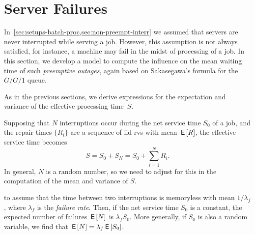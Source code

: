 

\section{Server Failures}
\label{sec:preempt-interr-serv}

In~\cref{sec:setups-batch-proc,sec:non-preempt-interr} we assumed that servers are never interrupted while serving a job.
However, this assumption is not always satisfied, for instance, a machine may fail in the midst of processing of a job.
In this section, we develop a model
to compute the influence on the mean waiting time of such \emph{preemptive outages}, again based on Sakasegawa's formula for the $G/G/1$ queue.



As in the previous sections, we derive expressions for the expectation and variance of the effective processing time~$S$.

Supposing that $N$ interruptions occur during the net service time $S_0$ of a job, and the repair times $\{R_i\}$ are a sequence of iid rvs with mean $\,\mathsf{E}\left[R\right]$, the effective service time becomes
\begin{equation}\label{eq:f1}
  S= S_0 + S_N = S_0 + \sum_{i=1}^N R_i.
\end{equation}
In general,  $N$ is a random number, so we need to adjust for this in the computation of the mean and variance of $S$.


 to assume that the time between two interruptions is memoryless with mean $1/\lambda_f$, where $\lambda_f$ is the \emph{failure rate}.
Then, if the net service time $S_0$ is a constant, the expected number of failures $\,\mathsf{E}\left[N\right]$ is $\lambda_f S_0$.
More generally, if $S_0$ is also a random variable, we find that $\,\mathsf{E}\left[N\right] =\lambda_f \,\mathsf{E}\left[S_0\right]$.

